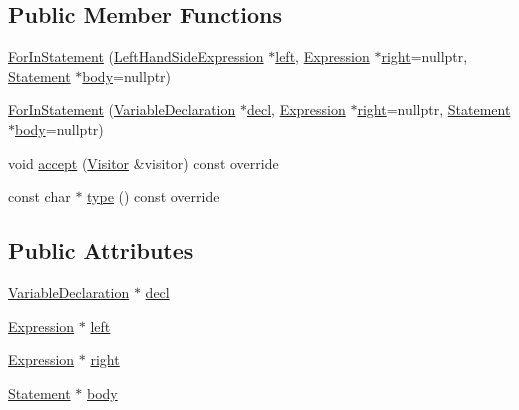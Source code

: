 \subsection*{Public Member Functions}
\begin{DoxyCompactItemize}
\item 
\hyperlink{struct_for_in_statement_aa3565db4851cca290147f4d98b275c68}{For\+In\+Statement} (\hyperlink{struct_left_hand_side_expression}{Left\+Hand\+Side\+Expression} $\ast$\hyperlink{struct_for_in_statement_acb865c777a9c3ccbe84ed09532f1a22f}{left}, \hyperlink{struct_expression}{Expression} $\ast$\hyperlink{struct_for_in_statement_a8aec27cbc19e2cb038acd3d0fc0a1969}{right}=nullptr, \hyperlink{struct_statement}{Statement} $\ast$\hyperlink{struct_for_in_statement_a865933063222b4eb53866423c444c1ca}{body}=nullptr)
\item 
\hyperlink{struct_for_in_statement_a3949dca565a177d23000804470272be6}{For\+In\+Statement} (\hyperlink{struct_variable_declaration}{Variable\+Declaration} $\ast$\hyperlink{struct_for_in_statement_a145dd51f7e729b6f065edc16d913662f}{decl}, \hyperlink{struct_expression}{Expression} $\ast$\hyperlink{struct_for_in_statement_a8aec27cbc19e2cb038acd3d0fc0a1969}{right}=nullptr, \hyperlink{struct_statement}{Statement} $\ast$\hyperlink{struct_for_in_statement_a865933063222b4eb53866423c444c1ca}{body}=nullptr)
\item 
void \hyperlink{struct_for_in_statement_ab5ee623aba6eebd12e52a9196e33e64b}{accept} (\hyperlink{struct_visitor}{Visitor} \&visitor) const override
\item 
const char $\ast$ \hyperlink{struct_for_in_statement_a5dd65175f49087b46e5e2f6d34246a1f}{type} () const override
\end{DoxyCompactItemize}
\subsection*{Public Attributes}
\begin{DoxyCompactItemize}
\item 
\hyperlink{struct_variable_declaration}{Variable\+Declaration} $\ast$ \hyperlink{struct_for_in_statement_a145dd51f7e729b6f065edc16d913662f}{decl}
\item 
\hyperlink{struct_expression}{Expression} $\ast$ \hyperlink{struct_for_in_statement_acb865c777a9c3ccbe84ed09532f1a22f}{left}
\item 
\hyperlink{struct_expression}{Expression} $\ast$ \hyperlink{struct_for_in_statement_a8aec27cbc19e2cb038acd3d0fc0a1969}{right}
\item 
\hyperlink{struct_statement}{Statement} $\ast$ \hyperlink{struct_for_in_statement_a865933063222b4eb53866423c444c1ca}{body}
\end{DoxyCompactItemize}


